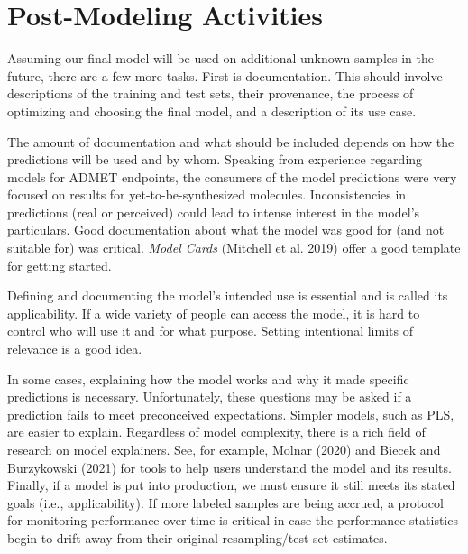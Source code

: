 \documentclass[
  letterpaper,
  DIV=11,
  numbers=noendperiod]{scrartcl}
\begin{document}
\hypertarget{post-modeling-activities}{%
\section{Post-Modeling Activities}\label{post-modeling-activities}}

Assuming our final model will be used on additional unknown samples in
the future, there are a few more tasks. First is documentation. This
should involve descriptions of the training and test sets, their
provenance, the process of optimizing and choosing the final model, and
a description of its use case.

The amount of documentation and what should be included depends on how
the predictions will be used and by whom. Speaking from experience
regarding models for ADMET endpoints, the consumers of the model
predictions were very focused on results for yet-to-be-synthesized
molecules. Inconsistencies in predictions (real or perceived) could lead
to intense interest in the model's particulars. Good documentation about
what the model was good for (and not suitable for) was critical.
\emph{Model Cards} (Mitchell et al. 2019) offer a good template for
getting started.

\begin{tcolorbox}[enhanced jigsaw, title=\textcolor{quarto-callout-important-color}{\faExclamation}\hspace{0.5em}{\textbf{WTF} \#14}, rightrule=.15mm, leftrule=.75mm, bottomtitle=1mm, opacityback=0, opacitybacktitle=0.6, bottomrule=.15mm, arc=.35mm, colframe=quarto-callout-important-color-frame, breakable, toprule=.15mm, toptitle=1mm, colback=white, titlerule=0mm, coltitle=black, left=2mm, colbacktitle=quarto-callout-important-color!10!white]

Defining and documenting the model's intended use is essential and is
called its applicability. If a wide variety of people can access the
model, it is hard to control who will use it and for what purpose.
Setting intentional limits of relevance is a good idea.

\end{tcolorbox}

In some cases, explaining how the model works and why it made specific
predictions is necessary. Unfortunately, these questions may be asked if
a prediction fails to meet preconceived expectations. Simpler models,
such as PLS, are easier to explain. Regardless of model complexity,
there is a rich field of research on model explainers. See, for example,
Molnar (2020) and Biecek and Burzykowski (2021) for tools to help users
understand the model and its results. Finally, if a model is put into
production, we must ensure it still meets its stated goals (i.e.,
applicability). If more labeled samples are being accrued, a protocol
for monitoring performance over time is critical in case the performance
statistics begin to drift away from their original resampling/test set
estimates.
\end{document}

